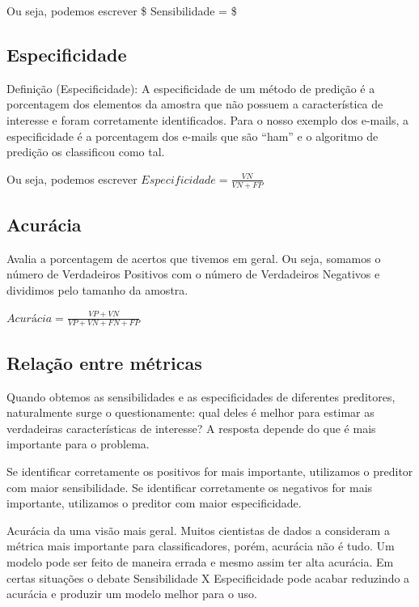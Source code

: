\documentclass[
  letterpaper,
  DIV=11,
  numbers=noendperiod]{scrreprt}
\begin{document}
Ou seja, podemos escrever \$ Sensibilidade = \$

\hypertarget{especificidade}{%
\subsection{Especificidade}\label{especificidade}}

Definição (Especificidade): A especificidade de um método de predição é
a porcentagem dos elementos da amostra que não possuem a característica
de interesse e foram corretamente identificados. Para o nosso exemplo
dos e-mails, a especificidade é a porcentagem dos e-mails que são
``ham'' e o algoritmo de predição os classificou como tal.

Ou seja, podemos escrever \(Especificidade = \frac{VN}{VN+FP}\)

\hypertarget{acuruxe1cia}{%
\subsection{Acurácia}\label{acuruxe1cia}}

Avalia a porcentagem de acertos que tivemos em geral. Ou seja, somamos o
número de Verdadeiros Positivos com o número de Verdadeiros Negativos e
dividimos pelo tamanho da amostra.

\(Acurácia = \frac{VP+VN}{VP+VN+FN+FP}\)

\hypertarget{relauxe7uxe3o-entre-muxe9tricas}{%
\subsection{Relação entre
métricas}\label{relauxe7uxe3o-entre-muxe9tricas}}

Quando obtemos as sensibilidades e as especificidades de diferentes
preditores, naturalmente surge o questionamente: qual deles é melhor
para estimar as verdadeiras características de interesse? A resposta
depende do que é mais importante para o problema.

Se identificar corretamente os positivos for mais importante, utilizamos
o preditor com maior sensibilidade. Se identificar corretamente os
negativos for mais importante, utilizamos o preditor com maior
especificidade.

Acurácia da uma visão mais geral. Muitos cientistas de dados a
consideram a métrica mais importante para classificadores, porém,
acurácia não é tudo. Um modelo pode ser feito de maneira errada e mesmo
assim ter alta acurácia. Em certas situações o debate Sensibilidade X
Especificidade pode acabar reduzindo a acurácia e produzir um modelo
melhor para o uso.
\end{document}
